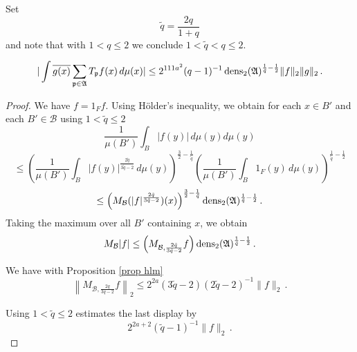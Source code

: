 Set
\begin{equation}
    \tilde{q}=\frac {2q}{1+q}
\end{equation}
and note that with $1< q\le 2$ we conclude $1<\tilde{q}<q\le 2$.
\begin{lemma}%
\label{lem decay t}

\begin{equation}\label{eqttt9}
    |\int \overline{g(x)} \sum_{\mathfrak p \in \mathfrak{A}} T_{\mathfrak p} f(x)\, d\mu(x)|\le
    2^{111a^2}({q}-1)^{-1} \operatorname{\operatorname{dens}}_2(\mathfrak{A})^{\frac 1{\tilde{q}}-\frac 12} \|f\|_2\|g\|_2\, .
\end{equation}
\end{lemma}
\begin{proof}
We have $f=1_Ff$. Using H\"older's inequality, we obtain for
each $x\in B'$ and each $B'\in \mathcal{B}$ using $1<\tilde{q}\le 2$
\begin{equation}
    \frac 1{\mu(B')}\int_B |f(y)|\, d\mu(y)d\mu(y)
\end{equation}
\begin{equation}
\le
\left(\frac 1{\mu(B')}\int_B |f(y)|^{\frac {2{\tilde{q}}}{3\tilde{q}-2}}\, d\mu(y)\right)^{\frac 32-\frac 1{\tilde{q}}}
\left(\frac 1{\mu(B')}\int_B 1_F(y)\, d\mu(y)\right)^{\frac 1{\tilde{q}}-\frac 12}
\end{equation}
\begin{equation}
\le \left(M_{\mathcal{B}} (|f|^{\frac {2{\tilde{q}}}{3{\tilde{q}}-2}})(x)\right)^{\frac 32-\frac 1{\tilde{q}}}
\operatorname{\operatorname{dens}}_2(\mathfrak{A})^{\frac 1{\tilde{q}}-\frac 12}\, .
\end{equation}
Taking the maximum over all $B'$ containing $x$, we obtain
\begin{equation} \label{eqttt1}
    M_{\mathcal{B}}|f|\le
        \left(M_{\mathcal{B},\frac {2{\tilde{q}}}{3{\tilde{q}}-2} } f\right)
\operatorname{\operatorname{dens}}_2(\mathfrak{A})^{\frac 1{\tilde{q}}-\frac 12}\, .
\end{equation}

We have with Proposition \ref{prop hlm}
\begin{equation}
\left\|M_{\mathcal{B}, \frac {2q}{3q-2}} f\right\|_2\le 2^{2a}(3\tilde{q}-2)(2\tilde{q}-2)^{-1}\|f\|_2\, .
\end{equation}

Using $1<\tilde{q}\le 2$ estimates the last display by
\begin{equation}\label{eqttt2}
    2^{2a+2} (\tilde{q}-1)^{-1}  \|f\|_2\, .
\end{equation}



\end{proof}
